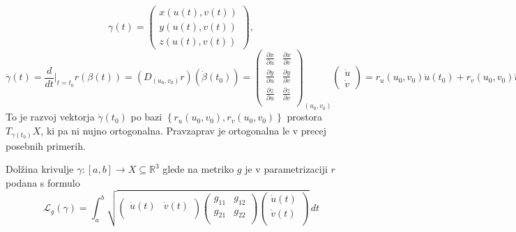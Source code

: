 \begin{equation*} \gamma(t) =  \begin{pmatrix}x(u(t), v(t))\\ y(u(t), v(t)) \\
z(u(t), v(t)) \end{pmatrix}, \end{equation*}
\begin{equation*} \dot{\gamma}(t) = \frac{d}{dt} \big|_{t = t_0} r(\beta(t)) =
(D_{(u_0, v_0)}r)(\dot{\beta}(t_0)) = 
\begin{pmatrix}
	\frac{ \partial x }{ \partial u }  & \frac{ \partial x }{ \partial v }  \\
	\frac{ \partial y }{ \partial u }  & \frac{ \partial y }{ \partial
	v }  \\
	\frac{ \partial z }{ \partial u }  & \frac{ \partial z }{ \partial v }  \\

\end{pmatrix}_{(u_0, v_0)}
\begin{pmatrix}
	\dot{u} \\ \dot{v}
\end{pmatrix}
 = r_u(u_0 , v_0)\dot{u}(t_0) + r_v(u_0 , v_0)\dot{v}(t_0). \end{equation*}
 To je razvoj vektorja $\dot{\gamma}(t_0)$ po bazi $\left\{ r_u(u_0 ,
v_0), r_v(u_0 , v_0) \right\}$ prostora $T_{\gamma(t_0)}X$, ki pa ni
nujno ortogonalna. Pravzaprav je ortogonalna le v precej posebnih
primerih. 

\begin{definicija}
\label{def_dolzina_krivulje}
Dolžina krivulje $\gamma: [a,b] \to  X \subseteq  \mathbb{R}^3$ glede
na metriko $g$ je v parametrizaciji $r$ podana s formulo 
\begin{equation*} \mathcal{L}_g(\gamma) = \int_{a}^{b} \sqrt{ 
\begin{pmatrix}
    \dot{u}(t) & \dot{v}(t) \\
\end{pmatrix}
\begin{pmatrix}
	g_{11} & g_{12}  \\
	g_{21} & g_{22} \\
\end{pmatrix}
\begin{pmatrix}
	\dot{u}(t) \\
	\dot{v}(t) \\
\end{pmatrix}
}  \, dt  \end{equation*}
\end{definicija}

